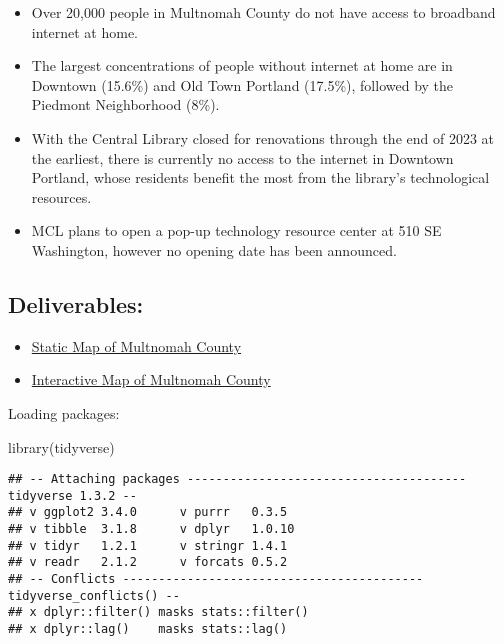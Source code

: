 \documentclass[
]{article}
\newenvironment{Shaded}{\begin{snugshade}}{\end{snugshade}}
\newcommand{\FunctionTok}[1]{\textcolor[rgb]{0.00,0.00,0.00}{#1}}
\newcommand{\NormalTok}[1]{#1}
\providecommand{\tightlist}{%
  \setlength{\itemsep}{0pt}\setlength{\parskip}{0pt}}
\begin{document}
\begin{itemize}
\tightlist
\item
  Over 20,000 people in Multnomah County do not have access to broadband
  internet at home.
\item
  The largest concentrations of people without internet at home are in
  Downtown (15.6\%) and Old Town Portland (17.5\%), followed by the
  Piedmont Neighborhood (8\%).
\item
  With the Central Library closed for renovations through the end of
  2023 at the earliest, there is currently no access to the internet in
  Downtown Portland, whose residents benefit the most from the library's
  technological resources.
\item
  MCL plans to open a pop-up technology resource center at 510 SE
  Washington, however no opening date has been announced.
\end{itemize}

\hypertarget{deliverables}{%
\subsection{Deliverables:}\label{deliverables}}

\begin{itemize}
\tightlist
\item
  \href{https://github.com/chanks06/chanks06.github.io/blob/main/multco_internet_map.pdf}{Static
  Map of Multnomah County}
\item
  \href{https://github.com/chanks06/chanks06.github.io/blob/main/multco_leaflet.html}{Interactive
  Map of Multnomah County}
\end{itemize}

Loading packages:

\begin{Shaded}
\begin{Highlighting}[]
\FunctionTok{library}\NormalTok{(tidyverse)}
\end{Highlighting}
\end{Shaded}

\begin{verbatim}
## -- Attaching packages --------------------------------------- tidyverse 1.3.2 --
## v ggplot2 3.4.0      v purrr   0.3.5 
## v tibble  3.1.8      v dplyr   1.0.10
## v tidyr   1.2.1      v stringr 1.4.1 
## v readr   2.1.2      v forcats 0.5.2 
## -- Conflicts ------------------------------------------ tidyverse_conflicts() --
## x dplyr::filter() masks stats::filter()
## x dplyr::lag()    masks stats::lag()
\end{verbatim}
\end{document}
